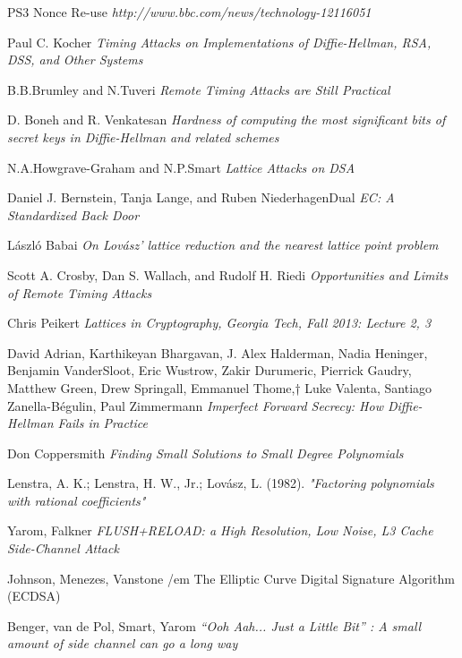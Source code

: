 \documentclass[a4paper,11pt]{article}
\begin{document}
\begin{thebibliography}{1}

 PS3 Nonce Re-use {\em http://www.bbc.com/news/technology-12116051}

 Paul C. Kocher {\em Timing Attacks on Implementations of Diffie-Hellman, RSA, DSS, and Other Systems}

 B.B.Brumley and N.Tuveri {\em Remote Timing Attacks are Still Practical}

 D. Boneh and R. Venkatesan {\em Hardness of computing the most significant bits of secret keys in Diffie-Hellman and related schemes}

 N.A.Howgrave-Graham and N.P.Smart {\em Lattice Attacks on DSA}

 Daniel J. Bernstein, Tanja Lange, and Ruben NiederhagenDual {\em EC: A Standardized Back Door}

 László Babai {\em On Lovász' lattice reduction and the nearest lattice point problem}

 Scott A. Crosby, Dan S. Wallach, and Rudolf H. Riedi {\em Opportunities and Limits of Remote Timing Attacks}

 Chris Peikert {\em Lattices in Cryptography, Georgia Tech, Fall 2013: Lecture 2, 3}

 David Adrian, Karthikeyan Bhargavan, J. Alex Halderman, Nadia Heninger, Benjamin VanderSloot, Eric Wustrow, Zakir Durumeric, Pierrick Gaudry, Matthew Green, Drew Springall, Emmanuel Thome,† Luke Valenta, Santiago Zanella-Bégulin, Paul Zimmermann {\em Imperfect Forward Secrecy: How Diffie-Hellman Fails in Practice}

 Don Coppersmith {\em Finding Small Solutions to Small Degree Polynomials}

 Lenstra, A. K.; Lenstra, H. W., Jr.; Lovász, L. (1982). {\em "Factoring polynomials with rational coefficients"}

 Yarom, Falkner {\em FLUSH+RELOAD: a High Resolution, Low Noise, L3 Cache Side-Channel Attack}

 Johnson, Menezes, Vanstone {/em The Elliptic Curve Digital Signature Algorithm (ECDSA)}

 Benger, van de Pol, Smart, Yarom {\em “Ooh Aah... Just a Little Bit” : A small amount of side channel can go a long way}


\end{thebibliography}
\end{document}
